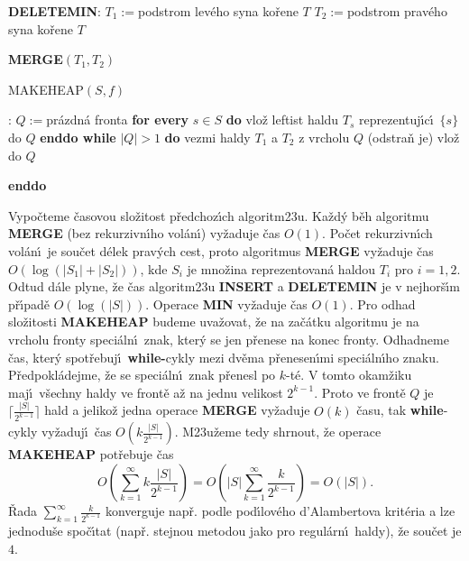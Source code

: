 {\bf DELETEMIN}:\newline 
$T_1:=$podstrom lev\'eho syna ko\v rene $T$\newline 
$T_2:=$podstrom prav\'eho syna ko\v rene $T$\newline 
{\bf MERGE$(T_1,T_2)$
\bigskip

MAKEHEAP$(S,f)$}:\newline 
$Q:=$pr\'azdn\'a fronta\newline 
{\bf for every} $s\in S$ {\bf do\newline 
\phantom{{\rm ---}}}vlo\v z leftist haldu $T_s$ reprezentuj\'\i c\'\i\ $
\{s\}$ do $Q$\newline 
{\bf enddo\newline 
while} $|Q|>1$ {\bf do\newline 
\phantom{{\rm ---}}}vezmi haldy $T_1$ a $T_2$ z vrcholu $Q$ 
(odstra\v n je)\newline 
\phantom{---}{\bf MERGE$(T_1,T_2)$} vlo\v z do $Q$\newline 
{\bf enddo
\bigskip


}\flushpar Vypo\v cteme \v casovou slo\v zitost p\v redchoz\'\i ch 
algoritm\accent23u. Ka\v zd\'y b\v eh 
algoritmu {\bf MERGE} (bez rekurzivn\'\i ho vol\'an\'\i ) vy\v zaduje \v cas 
$O(1)$. Po\v cet rekurzivn\'\i ch vol\'an\'\i\ je sou\v cet d\'elek prav\'ych 
cest, proto algoritmus {\bf MERGE} vy\v zaduje \v cas $O(\log(|S_
1|+|S_2|))$, 
kde $S_i$ je mno\v zina reprezentovan\'a haldou $T_i$ pro $i=1,2$.
Odtud d\'ale plyne, \v ze \v cas algoritm\accent23u {\bf INSERT} a 
{\bf DELETE\-MIN} je v 
nejhor\v s\'\i m p\v r\'\i pad\v e $O(\log(|S|))$. Operace {\bf MIN} vy\v zaduje 
\v cas $O(1)$. Pro odhad slo\v zitosti {\bf MA\-KEHEAP} budeme 
uva\v zovat, \v ze na za\v c\'atku algoritmu je na vrcholu fronty 
speci\'aln\'\i\ znak, kter\'y se jen p\v renese na konec fronty. 
Odhadneme \v cas, kter\'y spot\v rebuj\'\i\ {\bf while-}cykly mezi dv\v e\-ma 
p\v renesen\'\i mi speci\'aln\'\i ho znaku. P\v redpokl\'adejme, \v ze se 
spe\-ci\'al\-n\'\i\ znak p\v renesl po $k$-t\'e. V tomto okam\v ziku 
maj\'\i\ v\v sechny haldy ve front\v e a\v z na jednu velikost $2^{
k-1}$. 
Proto ve front\v e $Q$ je $\big\lceil \frac {|S|}{2^{k-1}}\big\rceil $ hald a jeliko\v z jedna operace 
{\bf MERGE} vy\v zadu\-je $O(k)$ \v casu, tak {\bf while}-cykly vy\v zaduj\'\i\ 
\v cas $O(k\frac {|S|}{2^{k-1}})$. M\accent23u\v zeme tedy shrnout, \v ze operace 
{\bf MAKEHEAP} pot\v rebuje \v cas 
$$O(\sum_{k=1}^{\infty}k\frac {|S|}{2^{k-1}})=O(|S|\sum_{k=1}^{\infty}\frac 
k{2^{k-1}})=O(|S|).$$
\v Rada $\sum_{k=1}^{\infty}$$\frac k{2^{k-1}}$ konverguje nap\v r. podle pod\'\i lov\'eho d'Alambertova 
krit\'eria a lze jednodu\v se spo\v c\'\i tat (nap\v r. stejnou metodou 
jako pro regul\'arn\'\i\ haldy), \v ze sou\v cet je $4$.
\medskip

